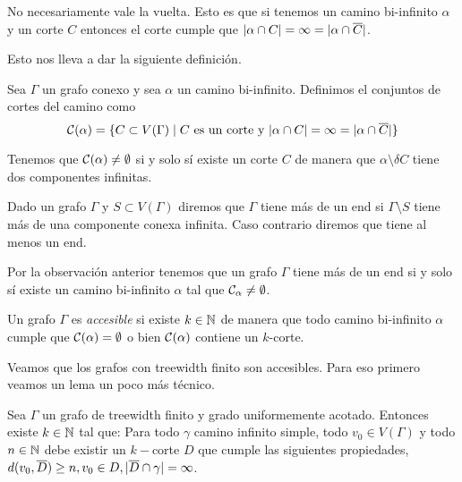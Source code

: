 \documentclass[tesis.tex]{subfiles}
\begin{document}
No necesariamente vale la vuelta.
Esto es que si tenemos un camino bi-infinito $\alpha$ y un corte $C$ entonces el corte cumple que $|\alpha \cap C| = \infty = |\alpha \cap \overline C|$.

Esto nos lleva a dar la siguiente definición.

\begin{deff}
	Sea $\Gamma$ un grafo conexo y sea $\alpha$ un camino bi-infinito.
	Definimos el conjuntos de cortes del camino como 
	\[
		{\cal C}(\alpha) = \{ C \subset V(\Gamma) \mid  C \ \text{es un corte y} \ |\alpha \cap C| = \infty = |\alpha \cap \overline C| \}
	\] 
\end{deff}

\begin{obs}
Tenemos que ${\cal C}(\alpha) \neq \emptyset$ si y solo sí existe un corte $C$ de manera que $\alpha \setminus \delta C$ tiene dos componentes infinitas.
\end{obs}
	
\begin{deff}
	Dado un grafo $\Gamma$ y $S \subset V(\Gamma)$ diremos que $\Gamma$ tiene más de un end si $\Gamma \setminus S$ tiene más de una componente conexa infinita.
	Caso contrario diremos que tiene al menos un end.
\end{deff}

\begin{obs}
	Por la observación anterior tenemos que un grafo $\Gamma$ tiene más de un end si y solo sí existe un camino bi-infinito $\alpha$ tal que ${\cal C}_{\alpha} \neq \emptyset$.
\end{obs}


\begin{deff}
	Un grafo $\Gamma$ es \emph{accesible} si existe $k \in \mathbb{N}$ de manera que todo camino bi-infinito $\alpha$ cumple que ${\cal C}(\alpha) = \emptyset$ o bien ${\cal C}(\alpha)$ contiene un $k$-corte.
\end{deff}

Veamos que los grafos con treewidth finito son accesibles.
Para eso primero veamos un lema un poco más técnico.

\begin{lema}\label{lema_corte_treewidth}
	Sea $\Gamma$ un grafo de treewidth finito y grado uniformemente acotado.
	Entonces existe $k \in \mathbb{N}$ tal que:
	Para todo $\gamma$ camino infinito simple, todo $v_0 \in V(\Gamma)$ y todo $n \in \mathbb{N}$ debe existir un $k-$corte $D$ que cumple las siguientes propiedades, $d(v_0,\overline D) \ge n, v_0 \in D, |\overline D \cap \gamma| = \infty$. 
\end{lema}
\end{document}
